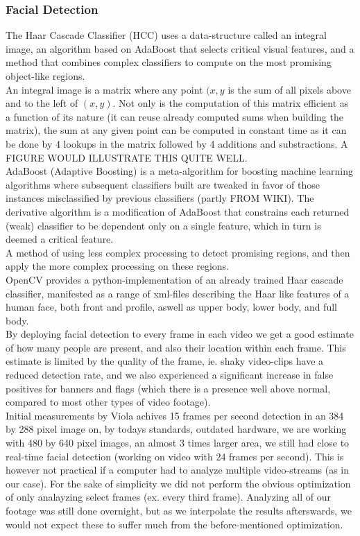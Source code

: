 \subsubsection{Facial Detection}
%
The Haar Cascade Classifier (HCC) uses a data-structure called an integral image, an algorithm based on AdaBoost that selects critical visual features, and a method that combines complex classifiers to compute on the most promising object-like regions.\\
An integral image is a matrix where any point $(x,y$ is the sum of all pixels above and to the left of $(x,y)$. Not only is the computation of this matrix efficient as a function of its nature (it can reuse already computed sums when building the matrix), the sum at any given point can be computed in constant time as it can be done by 4 lookups in the matrix followed by 4 additions and substractions. A FIGURE WOULD ILLUSTRATE THIS QUITE WELL.\\
AdaBoost (Adaptive Boosting) is a meta-algorithm for boosting machine learning algorithms where subsequent classifiers built are tweaked in favor of those instances misclassified by previous classifiers (partly FROM WIKI). The derivative algorithm is a modification of AdaBoost that constrains each returned (weak) classifier to be dependent only on a single feature, which in turn is deemed a critical feature.\\
A method of using less complex processing to detect promising regions, and then apply the more complex processing on these regions.\\
OpenCV provides a python-implementation of an already trained Haar cascade classifier, manifested as a range of xml-files describing the Haar like features of a human face, both front and profile, aswell as upper body, lower body, and full body.\\
By deploying facial detection to every frame in each video we get a good estimate of how many people are present, and also their location within each frame. This estimate is limited by the quality of the frame, ie. shaky video-clips have a reduced detection rate, and we also experienced a significant increase in false positives for banners and flags (which there is a presence well above normal, compared to most other types of video footage).\\
Initial measurements by Viola achives 15 frames per second detection in an 384 by 288 pixel image on, by todays standards, outdated hardware, we are working with 480 by 640 pixel images, an almost 3 times larger area, we still had close to real-time facial detection (working on video with 24 frames per second). This is however not practical if a computer had to analyze multiple video-streams (as in our case). For the sake of simplicity we did not perform the obvious optimization of only analayzing select frames (ex. every third frame). Analyzing all of our footage was still done overnight, but as we interpolate the results afterswards, we would not expect these to suffer much from the before-mentioned optimization.\\
